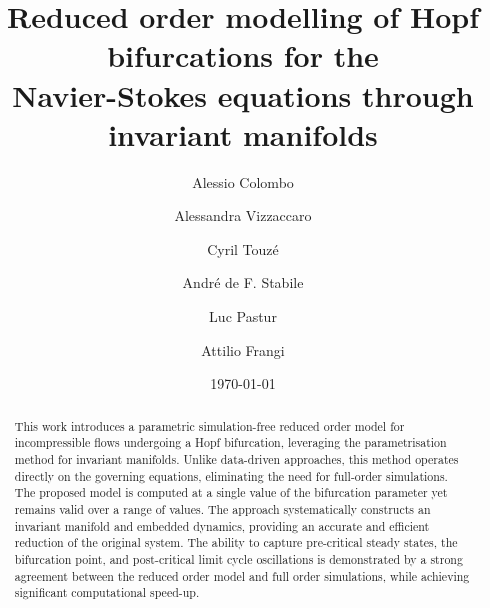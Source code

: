 \documentclass[%
reprint,
superscriptaddress,
 amsmath,amssymb,
 aps,
 pre
]{revtex4-2}
\begin{document}
\title{Reduced order modelling of Hopf bifurcations for the\\ Navier-Stokes equations through invariant manifolds}

\author{Alessio Colombo}
%

\author{Alessandra Vizzaccaro}
%

\author{Cyril Touz\'e}
%

\author{André de F. Stabile}
%

\author{Luc Pastur}
%

\author{Attilio Frangi}
%

\date{\today}

\begin{abstract} 
This work introduces a parametric simulation-free reduced order model for incompressible flows undergoing a Hopf bifurcation, leveraging the parametrisation method for invariant manifolds. Unlike data-driven approaches, this method operates directly on the governing equations, eliminating the need for full-order simulations. The proposed model is computed at a single value of the bifurcation parameter yet remains valid over a range of values. The approach systematically constructs an invariant manifold and embedded dynamics, providing an accurate and efficient reduction of the original system. The ability to capture pre-critical steady states, the bifurcation point, and post-critical limit cycle oscillations is demonstrated by a strong agreement between the reduced order model and full order simulations, while achieving significant computational speed-up.
\end{abstract}


\maketitle


\end{document}
